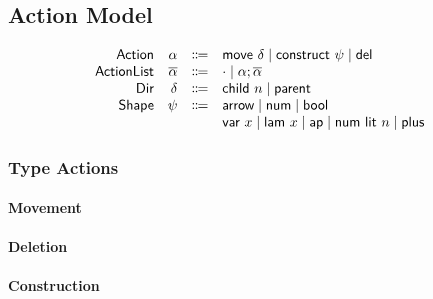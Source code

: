 \documentclass{article}
\begin{document}
\subsection{Action Model}
\[\begin{array}{rrcl}
  \AMName  & \AMV  & \Coloneqq & \AMove{\MMV} \mid \ACon{\SMV} \mid \ADel \\
  \AIMName & \AIMV & \Coloneqq & \AINil \mid \AICons{\AMV}{\AIMV} \\
  \MMName  & \MMV  & \Coloneqq & \MChild{\MChildNMV} \mid \MParent \\
  \SMName  & \SMV  & \Coloneqq & \STArrow \mid \STNum \mid \STBool \\
           &       &           & \SVar{x} \mid \SLam{x} \mid \SAp \mid \SNumLit{n} \mid \SPlus
\end{array}\]

\subsubsection{Type Actions}

\paragraph{Movement}
\begin{mathpar}



\end{mathpar}

\paragraph{Deletion}
\begin{mathpar}
\end{mathpar}

\paragraph{Construction}
\begin{mathpar}


\end{mathpar}
\end{document}
